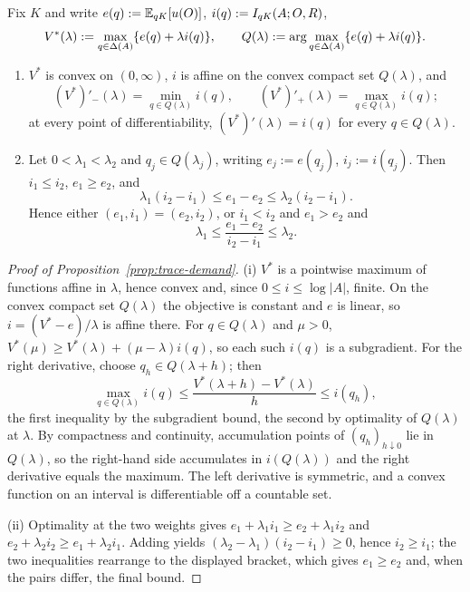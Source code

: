 \begin{proposition}\label{prop:trace-demand}
Fix $K$ and write $e(q):=\mathbb E_{qK}[u(O)]$, $i(q):=I_{qK}(A;O,R)$,
\[
 V^*(\lambda):=\max_{q\in\Delta(A)}\{e(q)+\lambda i(q)\},
 \qquad
 Q(\lambda):=\arg\max_{q\in\Delta(A)}\{e(q)+\lambda i(q)\}.
\]
\begin{enumerate}[label=\textup{(\roman*)},leftmargin=*]
\item $V^*$ is convex on $(0,\infty)$, $i$ is affine on the convex compact set $Q(\lambda)$, and
\[
 (V^*)'_-(\lambda)=\min_{q\in Q(\lambda)}i(q),
 \qquad
 (V^*)'_+(\lambda)=\max_{q\in Q(\lambda)}i(q);
\]
at every point of differentiability, $(V^*)'(\lambda)=i(q)$ for every $q\in Q(\lambda)$.
\item Let $0<\lambda_1<\lambda_2$ and $q_j\in Q(\lambda_j)$, writing $e_j:=e(q_j)$, $i_j:=i(q_j)$.  Then
$i_1\le i_2$, $e_1\ge e_2$, and
\[
 \lambda_1(i_2-i_1)\le e_1-e_2\le\lambda_2(i_2-i_1).
\]
Hence either $(e_1,i_1)=(e_2,i_2)$, or $i_1<i_2$ and $e_1>e_2$ and
\[
 \lambda_1\le\frac{e_1-e_2}{i_2-i_1}\le\lambda_2.
\]
\end{enumerate}
\end{proposition}

\begin{proof}[Proof of Proposition~\ref{prop:trace-demand}]
(i) $V^*$ is a pointwise maximum of functions affine in $\lambda$, hence convex and, since
$0\le i\le\log|A|$, finite.  On the convex compact set $Q(\lambda)$ the objective is constant and $e$ is linear, so
$i=(V^*-e)/\lambda$ is affine there.  For $q\in Q(\lambda)$ and $\mu>0$,
$V^*(\mu)\ge V^*(\lambda)+(\mu-\lambda)i(q)$, so each such $i(q)$ is a subgradient.  For the right derivative,
choose $q_h\in Q(\lambda+h)$; then
\[
 \max_{q\in Q(\lambda)}i(q)
 \le\frac{V^*(\lambda+h)-V^*(\lambda)}{h}
 \le i(q_h),
\]
the first inequality by the subgradient bound, the second by optimality of $Q(\lambda)$ at $\lambda$.  By
compactness and continuity, accumulation points of $(q_h)_{h\downarrow0}$ lie in $Q(\lambda)$, so the right-hand
side accumulates in $i(Q(\lambda))$ and the right derivative equals the maximum.  The left derivative is symmetric,
and a convex function on an interval is differentiable off a countable set.

(ii) Optimality at the two weights gives
$e_1+\lambda_1i_1\ge e_2+\lambda_1i_2$ and $e_2+\lambda_2i_2\ge e_1+\lambda_2i_1$.  Adding yields
$(\lambda_2-\lambda_1)(i_2-i_1)\ge0$, hence $i_2\ge i_1$; the two inequalities rearrange to the displayed bracket,
which gives $e_1\ge e_2$ and, when the pairs differ, the final bound.
\end{proof}

